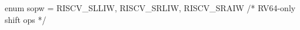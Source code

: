 enum sopw = {RISCV_SLLIW, RISCV_SRLIW,
             RISCV_SRAIW}                         /* RV64-only shift ops */
